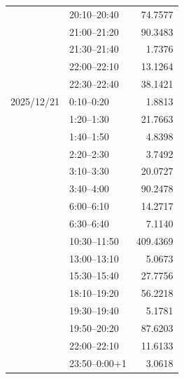 \begin{table}[H]
\begin{tabular}{llr}
     & 20:10--20:40 & 74.7577 \\
     & 21:00--21:20 & 90.3483 \\
     & 21:30--21:40 & 1.7376 \\
     & 22:00--22:10 & 13.1264 \\
     & 22:30--22:40 & 38.1421 \\
    2025/12/21 & 0:10--0:20 & 1.8813 \\
     & 1:20--1:30 & 21.7663 \\
     & 1:40--1:50 & 4.8398 \\
     & 2:20--2:30 & 3.7492 \\
     & 3:10--3:30 & 20.0727 \\
     & 3:40--4:00 & 90.2478 \\
     & 6:00--6:10 & 14.2717 \\
     & 6:30--6:40 & 7.1140 \\
     & 10:30--11:50 & 409.4369 \\
     & 13:00--13:10 & 5.0673 \\
     & 15:30--15:40 & 27.7756 \\
     & 18:10--19:20 & 56.2218 \\
     & 19:30--19:40 & 5.1781 \\
     & 19:50--20:20 & 87.6203 \\
     & 22:00--22:10 & 11.6133 \\
     & 23:50--0:00+1 & 3.0618 \\
    \bottomrule
  \end{tabular}
\end{table}